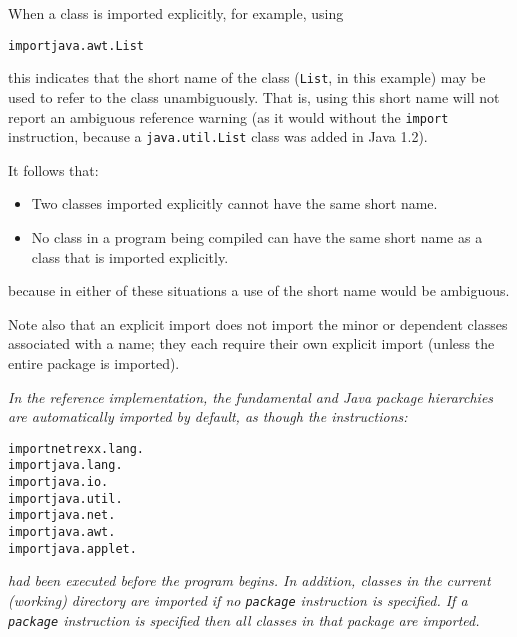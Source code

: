 When a class is imported explicitly, for example, using
\begin{alltt}
import java.awt.List
\end{alltt}
this indicates that the short name of the class (\texttt{List},
in this example) may be used to refer to the class unambiguously.
That is, using this short name will not report an ambiguous reference
warning (as it would without the \texttt{import} instruction, because
a \texttt{java.util.List} class was added in Java 1.2).
 
It follows that:
\begin{itemize}
\item Two classes imported explicitly cannot have the same short name.
\item No class in a program being compiled can have the same short name as
a class that is imported explicitly.
\end{itemize}
because in either of these situations a use of the short name would
be ambiguous.
 
Note also that an explicit import does not import the minor or dependent
classes associated with a name; they each require their own explicit
import (unless the entire package is imported).
 
\emph{In the reference implementation, the fundamental \nr{} and Java
package hierarchies are automatically imported by default, as though the
instructions:}
\begin{alltt}
import netrexx.lang.
import java.lang.
import java.io.
import java.util.
import java.net.
import java.awt.
import java.applet.
\end{alltt}
\emph{had been executed before the program begins.
In addition, classes in the current (working) directory are imported if
no \texttt{package} instruction is specified.  If a \texttt{package}
instruction is specified then all classes in that package are imported.
}
